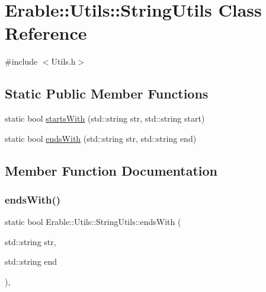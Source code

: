 \hypertarget{class_erable_1_1_utils_1_1_string_utils}{}\section{Erable\+::Utils\+::String\+Utils Class Reference}
\label{class_erable_1_1_utils_1_1_string_utils}


{\ttfamily \#include $<$Utils.\+h$>$}

\subsection*{Static Public Member Functions}
\begin{DoxyCompactItemize}
\item 
static bool \mbox{\hyperlink{class_erable_1_1_utils_1_1_string_utils_ac5371353c26618263229309450ec9fff}{starts\+With}} (std\+::string str, std\+::string start)
\item 
static bool \mbox{\hyperlink{class_erable_1_1_utils_1_1_string_utils_adb5eae1478cc5876bcb8d3301a15edc6}{ends\+With}} (std\+::string str, std\+::string end)
\end{DoxyCompactItemize}


\subsection{Member Function Documentation}
\mbox{\label{class_erable_1_1_utils_1_1_string_utils_adb5eae1478cc5876bcb8d3301a15edc6}} 
\subsubsection{\texorpdfstring{endsWith()}{endsWith()}}
{\footnotesize\ttfamily static bool Erable\+::\+Utils\+::\+String\+Utils\+::ends\+With (\begin{DoxyParamCaption}\item[{std\+::string}]{str,  }\item[{std\+::string}]{end }\end{DoxyParamCaption})\hspace{0.3cm}{\ttfamily [inline]}, {\ttfamily [static]}}

\mbox{\label{class_erable_1_1_utils_1_1_string_utils_ac5371353c26618263229309450ec9fff}} 
